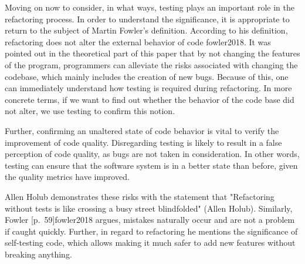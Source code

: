 
Moving on now to consider, in what ways, testing plays an important role in the refactoring process. In order to understand the significance, it is appropriate to return to the subject of Martin Fowler's definition. According to his definition, refactoring does not alter the external behavior of code {fowler2018}. It was pointed out in the theoretical part of this paper that by not changing the features of the program, programmers can alleviate the risks associated with changing the codebase, which mainly includes the creation of new bugs. Because of this, one can immediately understand how testing is required during refactoring. In more concrete terms, if we want to find out whether the behavior of the code base did not alter, we use testing to confirm this notion. 

Further, confirming an unaltered state of code behavior is vital to verify the improvement of code quality. Disregarding testing is likely to result in a false perception of code quality, as bugs are not taken in consideration. In other words, testing can ensure that the software system is in a better state than before, given the quality metrics have improved.

Allen Holub demonstrates these risks with the statement that "Refactoring without tests is like crossing a busy street blindfolded" (Allen Holub). Similarly, Fowler [p.~59]{fowler2018} argues, mistakes naturally occur and are not a problem if caught quickly. Further, in regard to refactoring he mentions the significance of self-testing code, which allows making it much safer to add new features without breaking anything.




